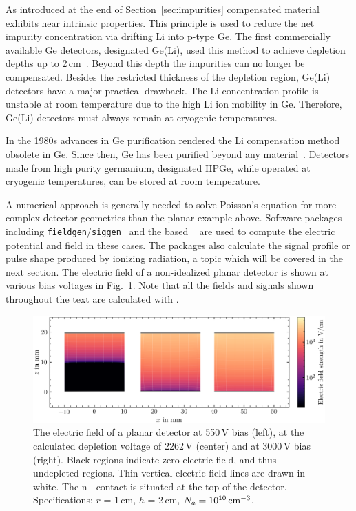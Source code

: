 As introduced at the end of Section~\ref{sec:impurities} compensated material exhibits near intrinsic properties. This principle is used to reduce the net impurity concentration via drifting Li into p-type Ge. The first commercially available Ge detectors, designated Ge(Li), used this method to achieve depletion depths up to 2\,cm~\cite{knoll}. Beyond this depth the impurities can no longer be compensated. Besides the restricted thickness of the depletion region, Ge(Li) detectors have a major practical drawback. The Li concentration profile is unstable at room temperature due to the high Li ion mobility in Ge. Therefore, Ge(Li) detectors must always remain at cryogenic temperatures.

In the 1980s advances in Ge purification rendered the Li compensation method obsolete in Ge. Since then, Ge has been purified beyond any material~\cite{knoll}. Detectors made from high purity germanium, designated HPGe, while operated at cryogenic temperatures, can be stored at room temperature.

A numerical approach is generally needed to solve Poisson's equation for more complex detector geometries than the planar example above. Software packages including \texttt{fieldgen}/\texttt{siggen}~\cite{siggen} and the \julia{} based \SSD{}~\cite{ssd} are used to compute the electric potential and field in these cases. The packages also calculate the signal profile or pulse shape produced by ionizing radiation, a topic which will be covered in the next section. The electric field of a non-idealized planar detector is shown at various bias voltages in Fig.~\ref{fig:planar}. Note that all the fields and signals shown throughout the text are calculated with \SSD{}.
\begin{figure}[htb]
	\centering
	\includegraphics[width=6in]{figs/ge/planar_depletion_width_6_9in.png}
	\caption{The electric field of a planar detector at 550\,V bias (left), at the calculated depletion voltage of 2262\,V (center) and at 3000\,V bias (right). Black regions indicate zero electric field, and thus undepleted regions. Thin vertical electric field lines are drawn in white. The n$^+$ contact is situated at the top of the detector. Specifications: $r$ = 1\,cm, $h$ = 2\,cm, $N_a = 10^{10}\text{\,cm}^{-3}$.} 
	\label{fig:planar}
\end{figure}

